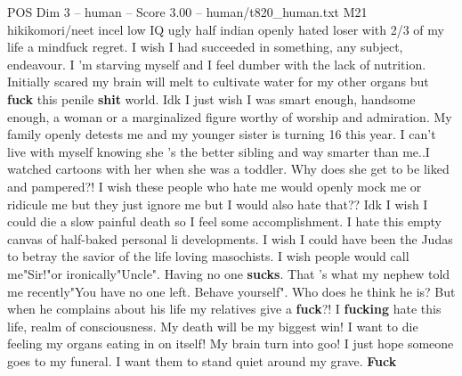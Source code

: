 \begin{textsample}{POS Dim 3 – human – Score 3.00 – human/t820\_human.txt}  \label{ex:f3_pos_020}
M21 hikikomori/neet incel low IQ ugly half indian openly hated loser with 2/3 of my life a mindfuck regret.
I wish I had succeeded in something, any subject, endeavour.
I 'm starving myself and I feel dumber with the lack of nutrition.
Initially scared my brain will melt to cultivate water for my other organs but \textbf{fuck} this penile \textbf{shit} world.
Idk I just wish I was smart enough, handsome enough, a woman or a marginalized figure worthy of worship and admiration.
My family openly detests me and my younger sister is turning 16 this year.
I can't live with myself knowing she 's the better sibling and way smarter than me..I watched cartoons with her when she was a toddler.
Why does she get to be liked and pampered?!
I wish these people who hate me would openly mock me or ridicule me but they just ignore me but I would also hate that??
Idk I wish I could die a slow painful death so I feel some accomplishment.
I hate this empty canvas of half-baked personal li developments.
I wish I could have been the Judas to betray the savior of the life loving masochists.
I wish people would call me"Sir!"or ironically"Uncle".
Having no one \textbf{sucks}.
That 's what my nephew told me recently"You have no one left.
Behave yourself".
Who does he think he is?
But when he complains about his life my relatives give a \textbf{fuck}?!
I \textbf{fucking} hate this life, realm of consciousness.
My death will be my biggest win!
I want to die feeling my organs eating in on itself!
My brain turn into goo!
I just hope someone goes to my funeral.
I want them to stand quiet around my grave. \textbf{Fuck}

\end{textsample}
